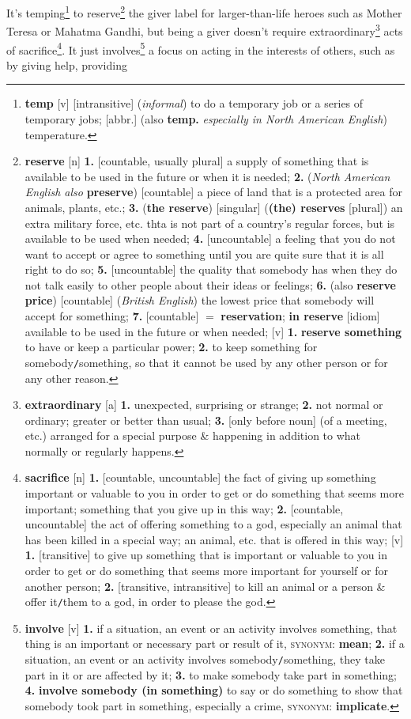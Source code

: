 \documentclass[oneside]{book}
\numberwithin{equation}{section}
\begin{document}
It's temping\footnote{\textbf{temp} [v] [intransitive] (\textit{informal}) to do a temporary job or a series of temporary jobs; [abbr.] (also \textbf{temp.} \textit{especially in North American English}) temperature.} to reserve\footnote{\textbf{reserve} [n] \textbf{1.} [countable, usually plural] a supply of something that is available to be used in the future or when it is needed; \textbf{2.} (\textit{North American English also} \textbf{preserve}) [countable] a piece of land that is a protected area for animals, plants, etc.; \textbf{3.} (\textbf{the reserve}) [singular] (\textbf{(the) reserves} [plural]) an extra military force, etc. thta is not part of a country's regular forces, but is available to be used when needed; \textbf{4.} [uncountable] a feeling that you do not want to accept or agree to something until you are quite sure that it is all right to do so; \textbf{5.} [uncountable] the quality that somebody has when they do not talk easily to other people about their ideas or feelings; \textbf{6.} (also \textbf{reserve price}) [countable] (\textit{British English}) the lowest price that somebody will accept for something; \textbf{7.} [countable] $=$ \textbf{reservation}; \textbf{in reserve} [idiom] available to be used in the future or when needed; [v] \textbf{1.} \textbf{reserve something} to have or keep a particular power; \textbf{2.} to keep something for somebody\texttt{/}something, so that it cannot be used by any other person or for any other reason.} the giver label for larger-than-life heroes such as Mother Teresa or Mahatma Gandhi, but being a giver doesn't require extraordinary\footnote{\textbf{extraordinary} [a] \textbf{1.} unexpected, surprising or strange; \textbf{2.} not normal or ordinary; greater or better than usual; \textbf{3.} [only before noun] (of a meeting, etc.) arranged for a special purpose \& happening in addition to what normally or regularly happens.} acts of sacrifice\footnote{\textbf{sacrifice} [n] \textbf{1.} [countable, uncountable] the fact of giving up something important or valuable to you in order to get or do something that seems more important; something that you give up in this way; \textbf{2.} [countable, uncountable] the act of offering something to a god, especially an animal that has been killed in a special way; an animal, etc. that is offered in this way; [v] \textbf{1.} [transitive] to give up something that is important or valuable to you in order to get or do something that seems more important for yourself or for another person; \textbf{2.} [transitive, intransitive] to kill an animal or a person \& offer it\texttt{/}them to a god, in order to please the god.}. It just involves\footnote{\textbf{involve} [v] \textbf{1.} if a situation, an event or an activity involves something, that thing is an important or necessary part or result of it, \textsc{synonym}: \textbf{mean}; \textbf{2.} if a situation, an event or an activity involves somebody\texttt{/}something, they take part in it or are affected by it; \textbf{3.} to make somebody take part in something; \textbf{4.} \textbf{involve somebody (in something)} to say or do something to show that somebody took part in something, especially a crime, \textsc{synonym}: \textbf{implicate}.} a focus on acting in the interests of others, such as by giving help, providing 
\end{document}
